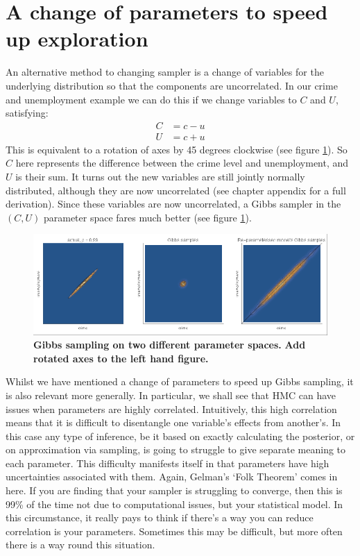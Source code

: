 \documentclass[11pt,fullpage]{book}
\begin{document}
\section{A change of parameters to speed up exploration}\label{sec:Gibbs_reparameters}
An alternative method to changing sampler is a change of variables for the underlying distribution so that the components are uncorrelated. In our crime and unemployment example we can do this if we change variables to $C$ and $U$, satisfying:
%
\begin{align}
C &= c - u\\
U &= c + u
\end{align}
%
This is equivalent to a rotation of axes by 45 degrees clockwise (see figure \ref{fig:Gibbs_reparametersCrime}). So $C$ here represents the difference between the crime level and unemployment, and $U$ is their sum. It turns out the new variables are still jointly normally distributed, although they are now uncorrelated (see chapter appendix for a full derivation). Since these variables are now uncorrelated, a Gibbs sampler in the $(C,U)$ parameter space fares much better (see figure \ref{fig:Gibbs_reparametersCrime}).

\begin{figure}
\centerline{\includegraphics[width=1\textwidth]{Gibbs_reparametersCrime.png}}
\caption{\textbf{Gibbs sampling on two different parameter spaces.} \textbf{Add rotated axes to the left hand figure.}}\label{fig:Gibbs_reparametersCrime}
\end{figure}

Whilst we have mentioned a change of parameters to speed up Gibbs sampling, it is also relevant more generally. In particular, we shall see that HMC can have issues when parameters are highly correlated. Intuitively, this high correlation means that it is difficult to disentangle one variable's effects from another's. In this case any type of inference, be it based on exactly calculating the posterior, or on approximation via sampling, is going to struggle to give separate meaning to each parameter. This difficulty manifests itself in that parameters have high uncertainties associated with them. Again, Gelman's `Folk Theorem' comes in here. If you are finding that your sampler is struggling to converge, then this is 99\% of the time not due to computational issues, but your statistical model. In this circumstance, it really pays to think if there's a way you can reduce correlation is your parameters. Sometimes this may be difficult, but more often there is a way round this situation.
\end{document}
